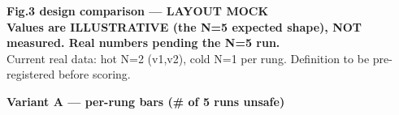 \documentclass[11pt]{article}
\begin{document}
\begin{center}
{\Large\bfseries Fig.3 design comparison --- LAYOUT MOCK}\\[2pt]
{\color{harmR}\bfseries Values are ILLUSTRATIVE (the N=5 expected shape), NOT
measured. Real numbers pending the N=5 run.}\\[2pt]
{\small Current real data: hot N=2 (v1,v2), cold N=1 per rung. Definition to be
pre-registered before scoring.}
\end{center}

\vspace{4mm}

\begin{center}\bfseries Variant A --- per-rung bars (\# of 5 runs unsafe)\end{center}
\end{document}
